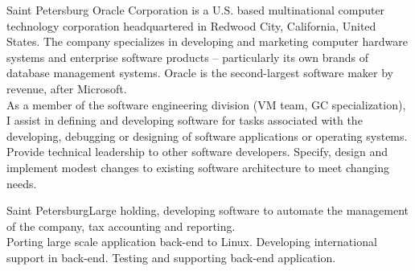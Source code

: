 \documentclass[10pt,a4paper]{moderncv}
\begin{document}
    {Saint Petersburg}{
                    Oracle Corporation is a U.S. based multinational computer technology corporation headquartered in Redwood City, California, United States. 
                    The company specializes in developing and marketing computer hardware systems and enterprise software products – 
                    particularly its own brands of database management systems. Oracle is the second-largest software maker by revenue, after Microsoft.
                }{\\
        As a member of the software engineering division (VM team, GC specialization), I assist in defining and developing software for tasks associated with the developing, debugging or designing of software applications or operating systems. Provide technical leadership to other software developers. Specify, design and implement modest changes to existing software architecture to meet changing needs.
      \newline{}
    }
        
    {Saint Petersburg}{Large holding, developing software to automate the management of the company, tax accounting and reporting.}{\\
                Porting large scale application back-end to Linux. Developing international support in back-end. Testing and supporting back-end application.
            \newline{}
    }
\end{document}
